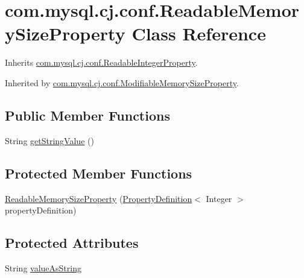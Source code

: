 \hypertarget{classcom_1_1mysql_1_1cj_1_1conf_1_1_readable_memory_size_property}{}\section{com.\+mysql.\+cj.\+conf.\+Readable\+Memory\+Size\+Property Class Reference}
\label{classcom_1_1mysql_1_1cj_1_1conf_1_1_readable_memory_size_property}


Inherits \mbox{\hyperlink{classcom_1_1mysql_1_1cj_1_1conf_1_1_readable_integer_property}{com.\+mysql.\+cj.\+conf.\+Readable\+Integer\+Property}}.



Inherited by \mbox{\hyperlink{classcom_1_1mysql_1_1cj_1_1conf_1_1_modifiable_memory_size_property}{com.\+mysql.\+cj.\+conf.\+Modifiable\+Memory\+Size\+Property}}.

\subsection*{Public Member Functions}
\begin{DoxyCompactItemize}
\item 
String \mbox{\hyperlink{classcom_1_1mysql_1_1cj_1_1conf_1_1_readable_memory_size_property_aa567293de20349f813addf59c7ecfbad}{get\+String\+Value}} ()
\end{DoxyCompactItemize}
\subsection*{Protected Member Functions}
\begin{DoxyCompactItemize}
\item 
\mbox{\hyperlink{classcom_1_1mysql_1_1cj_1_1conf_1_1_readable_memory_size_property_ac747858d1690da8c523be70b26d571a2}{Readable\+Memory\+Size\+Property}} (\mbox{\hyperlink{interfacecom_1_1mysql_1_1cj_1_1conf_1_1_property_definition}{Property\+Definition}}$<$ Integer $>$ property\+Definition)
\end{DoxyCompactItemize}
\subsection*{Protected Attributes}
\begin{DoxyCompactItemize}
\item 
String \mbox{\hyperlink{classcom_1_1mysql_1_1cj_1_1conf_1_1_readable_memory_size_property_a8a60af4f9a466b59aca2f18f55d6a096}{value\+As\+String}}
\end{DoxyCompactItemize}


